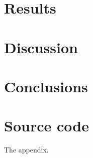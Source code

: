\documentclass[a4paper,11pt]{kth-mag}
\begin{document}
\chapter{Results} \label{chap:results}
    
\chapter{Discussion} \label{chap:discussion}
    
\chapter{Conclusions} \label{chap:conclusions}
    
\nocite{*}
\printbibliography

\appendix
\chapter{Source code}\label{appendix:sourcecode}

The appendix.
\end{document}
